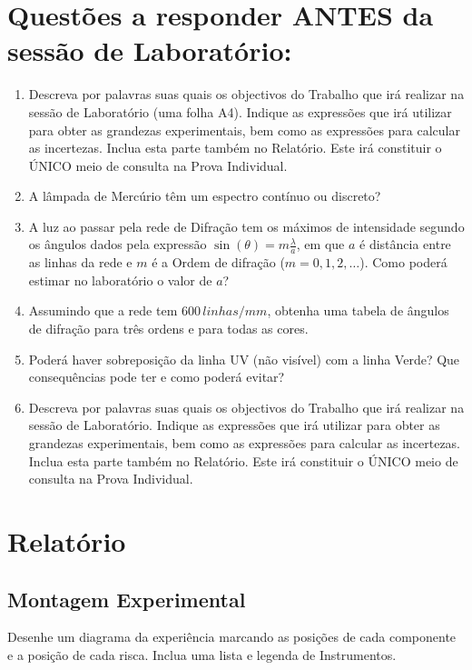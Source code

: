\documentclass[a4paper,12pt]{article}  %
\begin{document}
\section{\sf Questões a responder ANTES da sessão de Laboratório:}
\begin{enumerate}
\item Descreva por palavras suas quais os objectivos do Trabalho que irá realizar na sessão de Laboratório (uma folha A4). Indique as expressões que irá utilizar para obter as grandezas experimentais, bem como as expressões para calcular as incertezas. Inclua esta parte também no Relatório. Este irá constituir o ÚNICO meio de consulta na Prova Individual.

\item A lâmpada de Mercúrio têm um espectro contínuo ou discreto?
\item A luz ao passar pela rede de Difração tem os máximos de intensidade segundo os ângulos dados pela expressão $\sin(\theta) = m \frac{\lambda}{a}$, em que $a$ é distância entre as linhas da rede e $m$ é a Ordem de difração ($m=0,1,2,\ldots$). Como poderá estimar no laboratório o valor de $a$?
\item Assumindo que a rede tem $600\,linhas/mm$, obtenha uma tabela de ângulos de difração para três ordens e para todas as cores.
\item Poderá haver sobreposição da linha UV (não visível) com a linha Verde? Que consequências pode ter e como poderá evitar?
\item Descreva por palavras suas quais os objectivos do Trabalho que irá realizar na sessão de Laboratório. Indique as expressões que irá utilizar para obter as grandezas experimentais, bem como as expressões para calcular as incertezas. Inclua esta parte também no Relatório. Este irá constituir o ÚNICO meio de consulta na Prova Individual.  
\end{enumerate}

\section{\sf Relatório}
\subsection{\sf Montagem Experimental}
Desenhe um diagrama da experiência marcando as posições de cada componente e a posição de cada risca. Inclua uma lista e legenda de Instrumentos.

\begin{center}
\framebox[18cm]{\rule{0pt}{6.5cm}}
\end{center}
\end{document}
